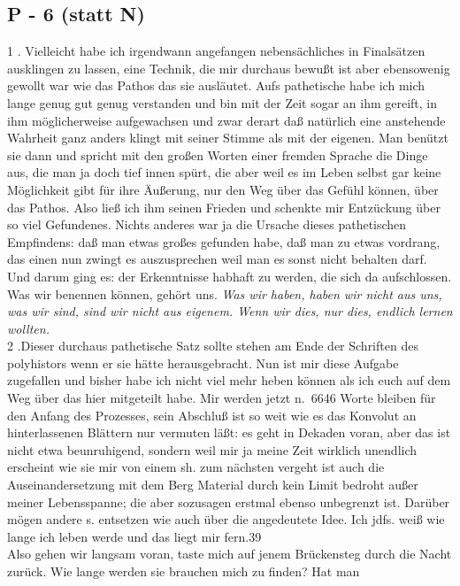 \documentclass[
]{article}
\author{}
\date{\vspace{-2.5em}}
\begin{document}
\subsection{P - 6 (statt N)}\label{p---6-statt-n}

1 . Vielleicht habe ich irgendwann angefangen nebensächliches in
Finalsätzen ausklingen zu lassen, eine Technik, die mir durchaus bewußt
ist aber ebensowenig gewollt war wie das Pathos das sie ausläutet.
Auf\textquotesingle s pathetische habe ich mich lange genug gut genug
verstanden und bin mit der Zeit sogar an ihm gereift, in ihm
möglicherweise aufgewachsen und zwar derart daß natürlich eine
anstehende Wahrheit ganz anders klingt mit seiner Stimme als mit der
eigenen. Man benützt sie dann und spricht mit den großen Worten einer
fremden Sprache die Dinge aus, die man ja doch tief innen spürt, die
aber weil es im Leben selbst gar keine Möglichkeit gibt für ihre
Äußerung, nur den Weg über das Gefühl können, über das Pathos. Also ließ
ich ihm seinen Frieden und schenkte mir Entzückung über so viel
Gefundenes. Nichts anderes war ja die Ursache dieses pathetischen
Empfindens: daß man etwas großes gefunden habe, daß man zu etwas
vordrang, das einen nun zwingt es auszusprechen weil man es sonst nicht
behalten darf. Und darum ging es: der Erkenntnisse habhaft zu werden,
die sich da aufschlossen. Was wir benennen können, gehört uns. \emph{Was
wir haben, haben wir nicht aus uns, was wir sind, sind wir nicht aus
eigenem. Wenn wir dies, nur dies, endlich lernen wollten.}\\
2 .Dieser durchaus pathetische Satz sollte stehen am Ende der Schriften
des polyhistors wenn er sie hätte herausgebracht. Nun ist mir diese
Aufgabe zugefallen und bisher habe ich nicht viel mehr heben können als
ich euch auf dem Weg über das hier mitgeteilt habe. Mir werden jetzt
n.~6646 Worte bleiben für den Anfang des Prozesses, sein Abschluß ist so
weit wie es das Konvolut an hinterlassenen Blättern nur vermuten läßt:
es geht in Dekaden voran, aber das ist nicht etwa beunruhigend, sondern
weil mir ja meine Zeit wirklich unendlich erscheint wie sie mir von
einem sh. zum nächsten vergeht ist auch die Auseinandersetzung mit dem
Berg Material durch kein Limit bedroht außer meiner Lebensspanne; die
aber sozusagen erstmal ebenso unbegrenzt ist. Darüber mögen andere s.
entsetzen wie auch über die angedeutete Idee. Ich jdfs. weiß wie lange
ich leben werde und das liegt mir fern.39\\
Also gehen wir langsam voran, taste mich auf jenem Brückensteg durch die
Nacht zurück. Wie lange werden sie brauchen mich zu finden? Hat man
\end{document}
